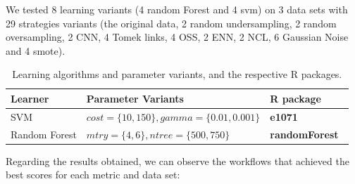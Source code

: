 \documentclass[10pt,a4paper]{article}\usepackage[]{graphicx}\usepackage[]{color}
\begin{document}
We tested 8 learning variants (4 random Forest and 4 svm) on 3 data sets with 29 strategies variants (the original data, 2 random undersampling, 2 random oversampling, 2 CNN, 4 Tomek links, 4 OSS, 2 ENN, 2 NCL, 6 Gaussian Noise and 4 smote).

\begin{table}[!tbp]
\begin{center}
\end{center}
\caption{Classification Data sets and characteristics(N: nr. of examples; Pnom: nr. of nominal predictors; Pnum: nr. of numeric predictors; nRare: nr. of examples in the rare class; \%Rare: nRare/N).}
\label{tab:ClassDataBinary}
\end{table}

\begin{table}[!tbp]
\begin{center}
\resizebox{\textwidth}{!} {
\begin{tabular}{lll}
\hline \hline
Learner & Parameter Variants & R package \\ 
\hline 
SVM & $cost=\{10,150\},gamma=\{0.01,0.001\}$ & \textbf{e1071}~\cite{e1071} \\ 
Random Forest & $mtry=\{4,6\},ntree=\{500,750\}$ & \textbf{randomForest}~\cite{rf} \\ 
\hline \hline
\end{tabular} 
}
\end{center}
\caption{Learning algorithms and parameter variants, and the respective R packages.}\label{tab:Sys}
\end{table}


Regarding the results obtained, we can observe the workflows that achieved the best scores for each metric and data set:
\end{document}
